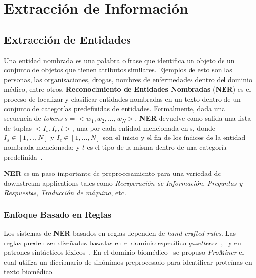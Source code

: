 \chapter{Extracción de Información}\label{chapter:information_extraction}

\section{Extracción de Entidades}

Una entidad nombrada es una palabra o frase que identifica un objeto de un conjunto de objetos que tienen atributos similares. Ejemplos de esto son las personas, las organizaciones, drogas, nombres de enfermedades dentro del dominio m\'edico, entre otros. \textbf{Reconocimiento de Entidades Nombradas} (\textbf{NER}) es el proceso de localizar y clasificar entidades nombradas en un texto dentro de un conjunto de categor\'ias predefinidas de entidades.
Formalmente, dada una secuencia de \emph{tokens} $s=<w_1, w_2, ..., w_N >$, \textbf{NER} devuelve como salida una lista de tuplas $<I_s, I_e, t>$, una por cada entidad mencionada en s, donde $I_s \in [1,...,N]$ y $I_e \in [1,...,N]$ son el inicio y el fin de los \'indices de la entidad nombrada mencionada; y $t$ es el tipo de la misma dentro de una categor\'ia predefinida~\cite{li2018survey}. 

\textbf{NER} es un paso importante de preprocesamiento para una variedad de downstream applications tales como \emph{Recuperaci\'on de Informaci\'on}, \emph{Preguntas y Respuestas}, \emph{Traducci\'on de m\'aquina}, etc.


\subsection{Enfoque Basado en Reglas}

Los sistemas de \textbf{NER} basados en reglas dependen de \emph{hand-crafted rules}. Las reglas pueden ser dise\~nadas basadas en el dominio espec\'ifico \emph{gazetteers}~\cite{etzioni2005unsupervised},~\cite{sekine2004definition} y en patrones sint\'acticos-l\'exicos~\cite{zhang2013unsupervised}. En el dominio biom\'edico~\cite{hanisch2005prominer} se propuso \emph{ProMiner} el cual utiliza un diccionario de sin\'onimos preprocesado para identificar prote\'inas en texto biom\'edico.

